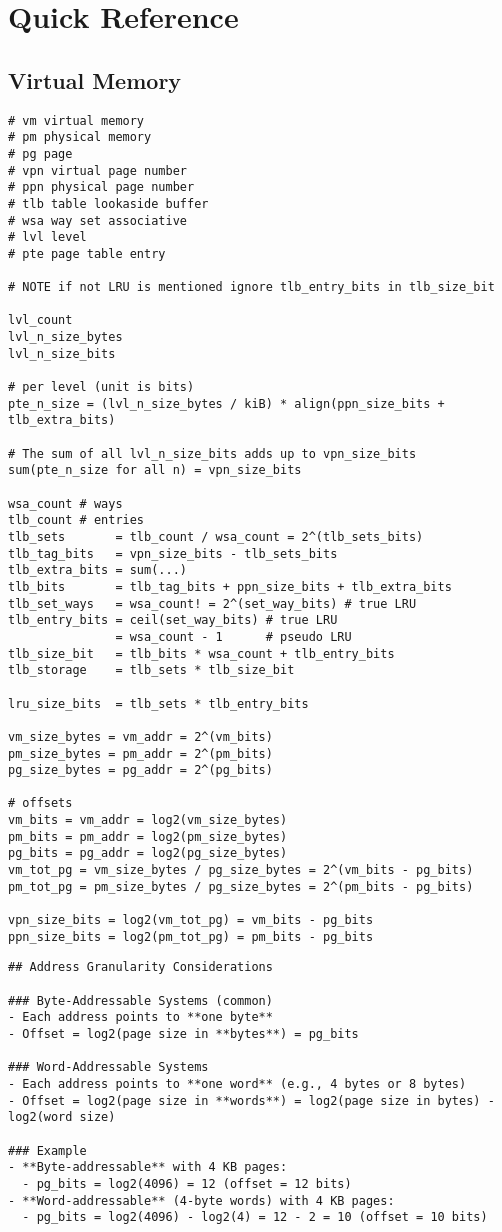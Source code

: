 \section{Quick Reference}
\subsection{Virtual Memory}
\begin{verbatim}
# vm virtual memory
# pm physical memory
# pg page
# vpn virtual page number
# ppn physical page number
# tlb table lookaside buffer
# wsa way set associative
# lvl level
# pte page table entry

# NOTE if not LRU is mentioned ignore tlb_entry_bits in tlb_size_bit

lvl_count
lvl_n_size_bytes
lvl_n_size_bits

# per level (unit is bits)
pte_n_size = (lvl_n_size_bytes / kiB) * align(ppn_size_bits + tlb_extra_bits)

# The sum of all lvl_n_size_bits adds up to vpn_size_bits
sum(pte_n_size for all n) = vpn_size_bits

wsa_count # ways
tlb_count # entries
tlb_sets       = tlb_count / wsa_count = 2^(tlb_sets_bits)
tlb_tag_bits   = vpn_size_bits - tlb_sets_bits
tlb_extra_bits = sum(...)
tlb_bits       = tlb_tag_bits + ppn_size_bits + tlb_extra_bits
tlb_set_ways   = wsa_count! = 2^(set_way_bits) # true LRU
tlb_entry_bits = ceil(set_way_bits) # true LRU
               = wsa_count - 1      # pseudo LRU
tlb_size_bit   = tlb_bits * wsa_count + tlb_entry_bits
tlb_storage    = tlb_sets * tlb_size_bit

lru_size_bits  = tlb_sets * tlb_entry_bits 

vm_size_bytes = vm_addr = 2^(vm_bits)
pm_size_bytes = pm_addr = 2^(pm_bits)
pg_size_bytes = pg_addr = 2^(pg_bits)

# offsets
vm_bits = vm_addr = log2(vm_size_bytes)
pm_bits = pm_addr = log2(pm_size_bytes)
pg_bits = pg_addr = log2(pg_size_bytes)
vm_tot_pg = vm_size_bytes / pg_size_bytes = 2^(vm_bits - pg_bits)
pm_tot_pg = pm_size_bytes / pg_size_bytes = 2^(pm_bits - pg_bits)

vpn_size_bits = log2(vm_tot_pg) = vm_bits - pg_bits
ppn_size_bits = log2(pm_tot_pg) = pm_bits - pg_bits
\end{verbatim}
\begin{verbatim}
## Address Granularity Considerations

### Byte-Addressable Systems (common)
- Each address points to **one byte**
- Offset = log2(page size in **bytes**) = pg_bits

### Word-Addressable Systems
- Each address points to **one word** (e.g., 4 bytes or 8 bytes)
- Offset = log2(page size in **words**) = log2(page size in bytes) - log2(word size)

### Example
- **Byte-addressable** with 4 KB pages:
  - pg_bits = log2(4096) = 12 (offset = 12 bits)
- **Word-addressable** (4-byte words) with 4 KB pages:
  - pg_bits = log2(4096) - log2(4) = 12 - 2 = 10 (offset = 10 bits)
\end{verbatim}
